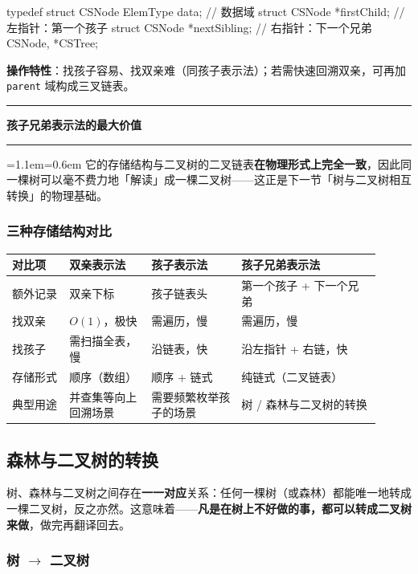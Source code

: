 \documentclass[11pt,openany,UTF8]{ctexbook}
\newcommand{\callouthead}[2]{%
  \par\addvspace{7pt}\noindent
  {\color{#1}\rule[-0.15em]{3pt}{1.05em}}\hspace{0.5em}%
  {\bfseries\color{#1}#2}\par\nobreak\vspace{-0.35em}%
  {\color{rulesep}\hrule height 0.4pt}\nobreak\vspace{0.45em}%
  \begingroup\small\setlength{\parindent}{0pt}%
  \leftskip=1.1em\rightskip=0.6em\noindent\ignorespaces}
\newcommand{\calloutend}{\par\endgroup\addvspace{7pt}}
\newenvironment{callkey}[1]{\callouthead{keybar}{#1}}{\calloutend}
\begin{document}
\begin{codebox}
typedef struct CSNode {
    ElemType data;                     // 数据域
    struct CSNode *firstChild;         // 左指针：第一个孩子
    struct CSNode *nextSibling;        // 右指针：下一个兄弟
} CSNode, *CSTree;
\end{codebox}

\textbf{操作特性}：找孩子容易、找双亲难（同孩子表示法）；若需快速回溯双亲，可再加 \texttt{parent} 域构成三叉链表。

\begin{callkey}{孩子兄弟表示法的最大价值}
它的存储结构与二叉树的二叉链表\textbf{在物理形式上完全一致}，因此同一棵树可以毫不费力地「解读」成一棵二叉树——这正是下一节「树与二叉树相互转换」的物理基础。

\end{callkey}

\subsubsection{三种存储结构对比}

\begingroup\small\setlength{\tabcolsep}{4.0pt}
\begin{longtable}{@{}L{0.1411\linewidth}L{0.2058\linewidth}L{0.2234\linewidth}L{0.3410\linewidth}@{}}
\toprule
\textbf{对比项} & \textbf{双亲表示法} & \textbf{孩子表示法} & \textbf{孩子兄弟表示法} \\
\midrule
\endhead
额外记录 & 双亲下标 & 孩子链表头 & 第一个孩子 + 下一个兄弟 \\
找双亲 & $O(1)$，极快 & 需遍历，慢 & 需遍历，慢 \\
找孩子 & 需扫描全表，慢 & 沿链表，快 & 沿左指针 + 右链，快 \\
存储形式 & 顺序（数组） & 顺序 + 链式 & 纯链式（二叉链表） \\
典型用途 & 并查集等向上回溯场景 & 需要频繁枚举孩子的场景 & 树 / 森林与二叉树的转换 \\
\bottomrule
\end{longtable}
\endgroup

\subsection{森林与二叉树的转换}

树、森林与二叉树之间存在\textbf{一一对应}关系：任何一棵树（或森林）都能唯一地转成一棵二叉树，反之亦然。这意味着——\textbf{凡是在树上不好做的事，都可以转成二叉树来做}，做完再翻译回去。

\subsubsection{树 $\to$ 二叉树}
\end{document}
